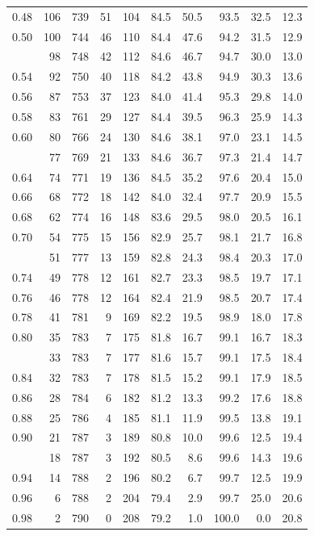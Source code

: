 \documentclass[
  11pt,
  letterpaper,
]{book}
\theoremstyle{definition}
\theoremstyle{definition}
\theoremstyle{definition}
\theoremstyle{definition}
\theoremstyle{remark}
\begin{document}
\begin{longtable}{rrrrrrrrrr}
0.48 & 106 & 739 & 51 & 104 & 84.5 & 50.5 & 93.5 & 32.5 & 12.3\\
0.50 & 100 & 744 & 46 & 110 & 84.4 & 47.6 & 94.2 & 31.5 & 12.9\\
\addlinespace
0.52 & 98 & 748 & 42 & 112 & 84.6 & 46.7 & 94.7 & 30.0 & 13.0\\
0.54 & 92 & 750 & 40 & 118 & 84.2 & 43.8 & 94.9 & 30.3 & 13.6\\
0.56 & 87 & 753 & 37 & 123 & 84.0 & 41.4 & 95.3 & 29.8 & 14.0\\
0.58 & 83 & 761 & 29 & 127 & 84.4 & 39.5 & 96.3 & 25.9 & 14.3\\
0.60 & 80 & 766 & 24 & 130 & 84.6 & 38.1 & 97.0 & 23.1 & 14.5\\
\addlinespace
0.62 & 77 & 769 & 21 & 133 & 84.6 & 36.7 & 97.3 & 21.4 & 14.7\\
0.64 & 74 & 771 & 19 & 136 & 84.5 & 35.2 & 97.6 & 20.4 & 15.0\\
0.66 & 68 & 772 & 18 & 142 & 84.0 & 32.4 & 97.7 & 20.9 & 15.5\\
0.68 & 62 & 774 & 16 & 148 & 83.6 & 29.5 & 98.0 & 20.5 & 16.1\\
0.70 & 54 & 775 & 15 & 156 & 82.9 & 25.7 & 98.1 & 21.7 & 16.8\\
\addlinespace
0.72 & 51 & 777 & 13 & 159 & 82.8 & 24.3 & 98.4 & 20.3 & 17.0\\
0.74 & 49 & 778 & 12 & 161 & 82.7 & 23.3 & 98.5 & 19.7 & 17.1\\
0.76 & 46 & 778 & 12 & 164 & 82.4 & 21.9 & 98.5 & 20.7 & 17.4\\
0.78 & 41 & 781 & 9 & 169 & 82.2 & 19.5 & 98.9 & 18.0 & 17.8\\
0.80 & 35 & 783 & 7 & 175 & 81.8 & 16.7 & 99.1 & 16.7 & 18.3\\
\addlinespace
0.82 & 33 & 783 & 7 & 177 & 81.6 & 15.7 & 99.1 & 17.5 & 18.4\\
0.84 & 32 & 783 & 7 & 178 & 81.5 & 15.2 & 99.1 & 17.9 & 18.5\\
0.86 & 28 & 784 & 6 & 182 & 81.2 & 13.3 & 99.2 & 17.6 & 18.8\\
0.88 & 25 & 786 & 4 & 185 & 81.1 & 11.9 & 99.5 & 13.8 & 19.1\\
0.90 & 21 & 787 & 3 & 189 & 80.8 & 10.0 & 99.6 & 12.5 & 19.4\\
\addlinespace
0.92 & 18 & 787 & 3 & 192 & 80.5 & 8.6 & 99.6 & 14.3 & 19.6\\
0.94 & 14 & 788 & 2 & 196 & 80.2 & 6.7 & 99.7 & 12.5 & 19.9\\
0.96 & 6 & 788 & 2 & 204 & 79.4 & 2.9 & 99.7 & 25.0 & 20.6\\
0.98 & 2 & 790 & 0 & 208 & 79.2 & 1.0 & 100.0 & 0.0 & 20.8\\
\bottomrule
\end{longtable}
\end{document}
